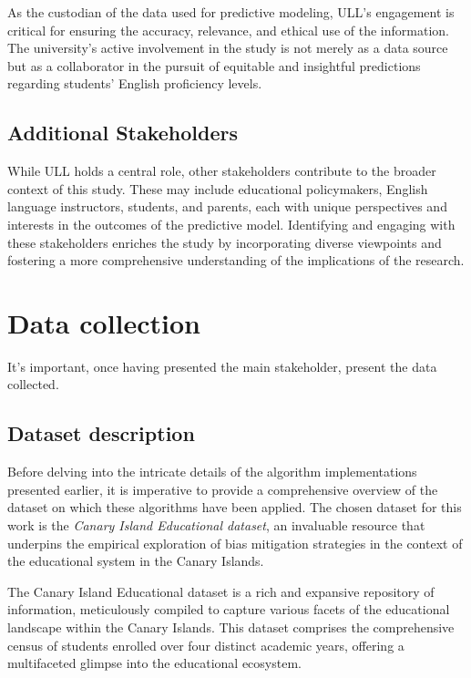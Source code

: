 \documentclass[12pt,a4paper,openright,twoside]{book}
\begin{document}
As the custodian of the data used for predictive modeling, ULL's engagement is critical for ensuring the accuracy, relevance, and ethical use of the information. The university's active involvement in the study is not merely as a data source but as a collaborator in the pursuit of equitable and insightful predictions regarding students' English proficiency levels.

\subsection{Additional Stakeholders}

While ULL holds a central role, other stakeholders contribute to the broader context of this study. These may include educational policymakers, English language instructors, students, and parents, each with unique perspectives and interests in the outcomes of the predictive model. Identifying and engaging with these stakeholders enriches the study by incorporating diverse viewpoints and fostering a more comprehensive understanding of the implications of the research.

\section{Data collection}

It's important, once having presented the main stakeholder, present the data collected.

\subsection{Dataset description}

Before delving into the intricate details of the algorithm implementations presented earlier, it is imperative to provide a comprehensive overview of the dataset on which these algorithms have been applied. The chosen dataset for this work is the \emph{Canary Island Educational dataset}, an invaluable resource that underpins the empirical exploration of bias mitigation strategies in the context of the educational system in the Canary Islands. 

The Canary Island Educational dataset is a rich and expansive repository of information, meticulously compiled to capture various facets of the educational landscape within the Canary Islands. This dataset comprises the comprehensive census of students enrolled over four distinct academic years, offering a multifaceted glimpse into the educational ecosystem. 
\end{document}
